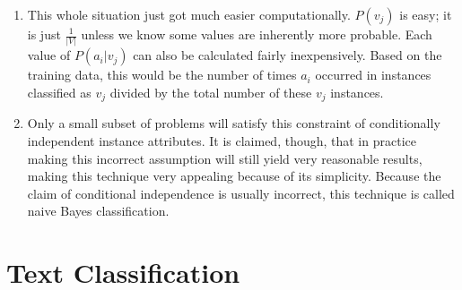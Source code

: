 \documentclass[a4paper,12pt]{article}
\begin{document}
\begin{enumerate}[]
  \item This whole situation just got much easier
    computationally. $P(v_j)$ is easy; it is just $\frac{1}{|V|}$
    unless we know some values are inherently more probable. Each
    value of $P(a_i|v_j)$ can also be calculated fairly
    inexpensively. Based on the training data, this would be the
    number of times $a_i$ occurred in instances classified as $v_j$
    divided by the total number of these $v_j$ instances.

  \item Only a small subset of problems will satisfy this constraint
    of conditionally independent instance attributes. It is claimed,
    though, that in practice making this incorrect assumption will
    still yield very reasonable results, making this technique very
    appealing because of its simplicity. Because the claim of
    conditional independence is usually incorrect, this technique is
    called naive Bayes classification.
    
\end{enumerate}

\section*{Text Classification}
\end{document}
